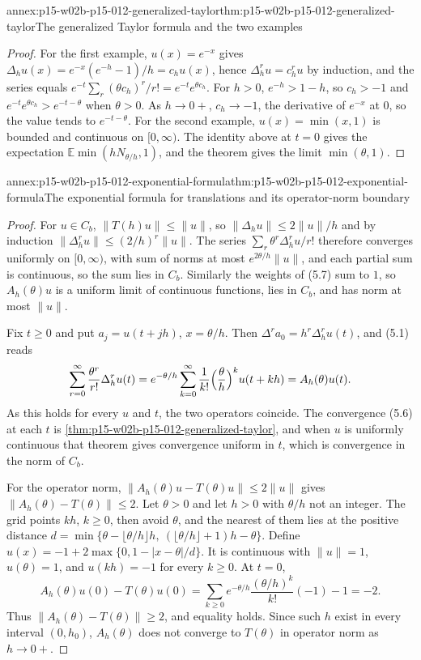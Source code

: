 \begin{annexitem}{annex:p15-w02b-p15-012-generalized-taylor}{thm:p15-w02b-p15-012-generalized-taylor}{The generalized Taylor formula and the two examples}
\begin{proof}
For the first example, \(u(x)=e^{-x}\) gives
\(\Delta_hu(x)=e^{-x}(e^{-h}-1)/h=c_hu(x)\), hence \(\Delta_h^ru=c_h^ru\) by
induction, and the series equals
\(e^{-t}\sum_r(\theta c_h)^r/r!=e^{-t}e^{\theta c_h}\). For \(h>0\),
\(e^{-h}>1-h\), so \(c_h>-1\) and \(e^{-t}e^{\theta c_h}>e^{-t-\theta}\) when
\(\theta>0\). As \(h\to0+\), \(c_h\to-1\), the derivative of \(e^{-x}\) at
\(0\), so the value tends to \(e^{-t-\theta}\).
For the second example, \(u(x)=\min(x,1)\) is bounded and continuous on
\([0,\infty)\). The identity above at \(t=0\) gives the expectation
\(\mathbb E\min(hN_{\theta/h},1)\), and the theorem gives the limit
\(\min(\theta,1)\).
\end{proof}
\end{annexitem}

\begin{annexitem}{annex:p15-w02b-p15-012-exponential-formula}{thm:p15-w02b-p15-012-exponential-formula}{The exponential formula for translations and its operator-norm boundary}
\begin{proof}
For \(u\in C_b\), \(\|T(h)u\|\leq\|u\|\), so \(\|\Delta_hu\|\leq2\|u\|/h\)
and by induction \(\|\Delta_h^ru\|\leq(2/h)^r\|u\|\). The series
\(\sum_r\theta^r\Delta_h^ru/r!\) therefore converges uniformly on
\([0,\infty)\), with sum of norms at most \(e^{2\theta/h}\|u\|\), and each
partial sum is continuous, so the sum lies in \(C_b\). Similarly the
weights of (5.7) sum to \(1\), so \(A_h(\theta)u\) is a uniform limit of
continuous functions, lies in \(C_b\), and has norm at most \(\|u\|\).

Fix \(t\geq0\) and put \(a_j=u(t+jh)\), \(x=\theta/h\). Then
\(\Delta^ra_0=h^r\Delta_h^ru(t)\), and (5.1) reads
\[
 \sum_{r=0}^\infty\frac{\theta^r}{r!}\Delta_h^ru(t)
   =e^{-\theta/h}\sum_{k=0}^\infty\frac1{k!}\Bigl(\frac\theta h\Bigr)^k u(t+kh)
   =A_h(\theta)u(t).
\]
As this holds for every \(u\) and \(t\), the two operators coincide. The
convergence (5.6) at each \(t\) is
\cref{thm:p15-w02b-p15-012-generalized-taylor}, and when \(u\) is uniformly
continuous that theorem gives convergence uniform in \(t\), which is
convergence in the norm of \(C_b\).

For the operator norm, \(\|A_h(\theta)u-T(\theta)u\|\leq2\|u\|\) gives
\(\|A_h(\theta)-T(\theta)\|\leq2\). Let \(\theta>0\) and let \(h>0\) with
\(\theta/h\) not an integer. The grid points \(kh\), \(k\geq0\), then avoid
\(\theta\), and the nearest of them lies at the positive distance
\(d=\min\{\theta-\lfloor\theta/h\rfloor h,\ (\lfloor\theta/h\rfloor+1)h-\theta\}\).
Define \(u(x)=-1+2\max\{0,1-|x-\theta|/d\}\). It is continuous with
\(\|u\|=1\), \(u(\theta)=1\), and \(u(kh)=-1\) for every \(k\geq0\). At
\(t=0\),
\[
 A_h(\theta)u(0)-T(\theta)u(0)=\sum_{k\geq0}e^{-\theta/h}\frac{(\theta/h)^k}{k!}(-1)-1=-2 .
\]
Thus \(\|A_h(\theta)-T(\theta)\|\geq2\), and equality holds. Since such \(h\)
exist in every interval \((0,h_0)\), \(A_h(\theta)\) does not converge to
\(T(\theta)\) in operator norm as \(h\to0+\).
\end{proof}
\end{annexitem}

